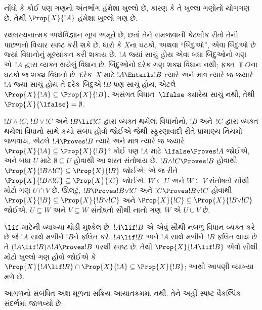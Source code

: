 નોંધો કે કોઈ પણ ગણનો અંતર્ભાગ હંમેશા ખુલ્લો છે, કારણ કે
તે ખુલ્લા ગણોનો યોગગણ છે. તેથી $\Prop{X}{!A}$ હંમેશા
ખુલ્લો ગણ છે.

સ્થલરચનાત્મક અર્થવિજ્ઞાન ખૂબ અમૂર્ત છે, છતાં તેને સમજવાની
કેટલીક રીતો તેની પાછળનો વિચાર સ્પષ્ટ કરી શકે છે. ધારો કે
$X$ના ઘટકો, અથવા ``બિંદુઓ'', એવા બિંદુઓ છે જ્યાં
વિધાનોનું મૂલ્યાંકન કરી શકાય છે. $!A$ જ્યાં સાચું હોય એવા
બધા બિંદુઓનો ગણ એ~$!A$ દ્વારા વ્યક્ત થયેલું વિધાન છે.
બિંદુઓનો દરેક ગણ શક્ય વિધાન નથી; ફક્ત $\Top{O}$ના
ઘટકો જ શક્ય વિધાનો છે. દરેક~$X$ માટે $!A \Entails !B$
ત્યારે અને માત્ર ત્યારે જ જ્યારે $!A$ જ્યાં સાચું હોય તે
દરેક બિંદુએ $!B$ પણ સાચું હોય, એટલે $\Prop{X}{!A}
\subseteq \Prop{X}{!B}$. અસંગત વિધાન~$\lfalse$ ક્યારેય
સાચું નથી, તેથી $\Prop{X}{\lfalse} = \emptyset$.

$!B \land !C$, $!B \lor !C$ અને $!B \lif !C$ દ્વારા
વ્યક્ત થયેલાં વિધાનોનો, $!B$ અને~$!C$ દ્વારા વ્યક્ત થયેલાં
વિધાનો સાથે કયો સંબંધ હોવો જોઈએ જેથી સ્ફુરણાવાદી રીતે
પ્રામાણ્ય નિયમો જળવાય, એટલે $!A \Proves !B$ ત્યારે અને માત્ર
ત્યારે જ જ્યારે $\Prop{X}{!A} \subseteq \Prop{X}{!B}$?
કોઈ પણ $!A$ માટે $\lfalse \Proves !A$ જોઈએ, અને બધા
$U$ માટે $\emptyset \subseteq U$ હોવાથી આ શરત સંતોષાય
છે. $!B \land !C \Proves !B$ હોવાથી
$\Prop{X}{!B \land !C} \subseteq \Prop{X}{!B}$ જોઈએ;
એ જ રીતે $\Prop{X}{!B \land !C} \subseteq \Prop{X}{!C}$
જોઈએ. $W \subseteq U$ અને $W \subseteq V$ સંતોષતો સૌથી
મોટો ગણ $U \cap V$ છે. ઊલટું, $!B \Proves !B \lor !C$
અને $!C \Proves !B \lor !C$ હોવાથી
$\Prop{X}{!B} \subseteq \Prop{X}{!B \lor !C}$ અને
$\Prop{X}{!C} \subseteq \Prop{X}{!B \lor !C}$ જોઈએ.
$U \subseteq W$ અને $V \subseteq W$ સંતોષતો સૌથી નાનો
ગણ~$W$ એ $U \cup V$ છે.

$\lif$ માટેની વ્યાખ્યા થોડી મુશ્કેલ છે: $!A \lif !B$ એ
એવું સૌથી નબળું વિધાન વ્યક્ત કરે છે જે $!A$ સાથે મળીને
$!B$ને ફલિત કરે. $!A \lif !B$ અને $!A$ સાથે મળીને~$!B$
ફલિત થાય છે તે $(!A \lif !B) \land !A \Proves !B $
પરથી સ્પષ્ટ છે. તેથી $\Prop{X}{!A \lif !B}$ એવો સૌથી મોટો
ખુલ્લો ગણ હોવો જોઈએ કે $\Prop{X}{!A \lif !B} \cap \Prop{X}{!A}
\subseteq \Prop{X}{!B}$; આથી આપણી વ્યાખ્યા મળે છે.
\endgroup


\OLEndChapterHook


\begin{editorial}
આગળનો સંબંધિત અંશ મૂળના સક્રિય આયાતક્રમમાં નથી. તેને અહીં સ્પષ્ટ વૈકલ્પિક સંદર્ભમાં જાળવ્યો છે.
\end{editorial}
\begingroup
\makeatletter{}\makeatother

